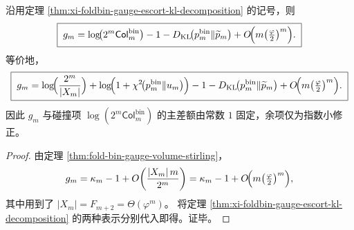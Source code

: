 \begin{corollary}[规范体积密度的碰撞表达与常数主差额]\label{cor:xi-foldbin-gauge-collision-rigid-shift}
沿用定理 \ref{thm:xi-foldbin-gauge-escort-kl-decomposition} 的记号，则
\[
\boxed{\;
g_m
=
\log\!\bigl(2^m\mathsf{Col}^{\mathrm{bin}}_m\bigr)
-1
-D_{\mathrm{KL}}\!\bigl(p_m^{\mathrm{bin}}\|\widetilde p_m\bigr)
+O\!\Bigl(m\bigl(\tfrac{\varphi}{2}\bigr)^m\Bigr).
\;}
\]
等价地，
\[
\boxed{\;
g_m
=
\log\!\Bigl(\frac{2^m}{|X_m|}\Bigr)
+\log\!\Bigl(1+\chi^2\!\bigl(p_m^{\mathrm{bin}}\|u_m\bigr)\Bigr)
-1
-D_{\mathrm{KL}}\!\bigl(p_m^{\mathrm{bin}}\|\widetilde p_m\bigr)
+O\!\Bigl(m\bigl(\tfrac{\varphi}{2}\bigr)^m\Bigr).
\;}
\]
因此 \(g_m\) 与碰撞项 \(\log(2^m\mathsf{Col}^{\mathrm{bin}}_m)\) 的主差额由常数 \(1\) 固定，余项仅为指数小修正。
\end{corollary}
\begin{proof}
由定理 \ref{thm:fold-bin-gauge-volume-stirling}，
\[
g_m=\kappa_m-1+O\!\left(\frac{|X_m|\,m}{2^m}\right)
=
\kappa_m-1+O\!\Bigl(m\bigl(\tfrac{\varphi}{2}\bigr)^m\Bigr),
\]
其中用到了 \(|X_m|=F_{m+2}=\Theta(\varphi^m)\)。
将定理 \ref{thm:xi-foldbin-gauge-escort-kl-decomposition} 的两种表示分别代入即得。证毕。
\end{proof}

